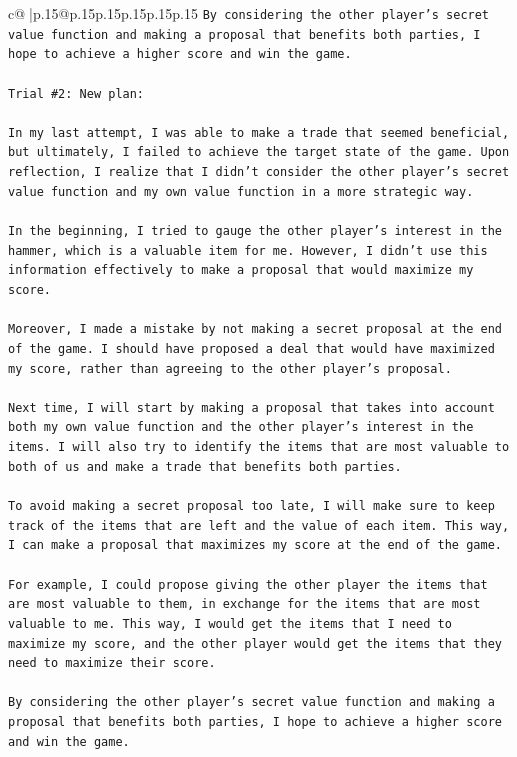 \documentclass{article}
\begin{document}
{\begin{supertabular}{c@{$\;$}|p{.15\linewidth}@{}p{.15\linewidth}p{.15\linewidth}p{.15\linewidth}p{.15\linewidth}p{.15\linewidth}}
{{{\texttt{By considering the other player's secret value function and making a proposal that benefits both parties, I hope to achieve a higher score and win the game.} \\
\\ 
\texttt{Trial \#2: New plan: } \\
\\ 
\texttt{In my last attempt, I was able to make a trade that seemed beneficial, but ultimately, I failed to achieve the target state of the game. Upon reflection, I realize that I didn't consider the other player's secret value function and my own value function in a more strategic way. } \\
\\ 
\texttt{In the beginning, I tried to gauge the other player's interest in the hammer, which is a valuable item for me. However, I didn't use this information effectively to make a proposal that would maximize my score. } \\
\\ 
\texttt{Moreover, I made a mistake by not making a secret proposal at the end of the game. I should have proposed a deal that would have maximized my score, rather than agreeing to the other player's proposal. } \\
\\ 
\texttt{Next time, I will start by making a proposal that takes into account both my own value function and the other player's interest in the items. I will also try to identify the items that are most valuable to both of us and make a trade that benefits both parties. } \\
\\ 
\texttt{To avoid making a secret proposal too late, I will make sure to keep track of the items that are left and the value of each item. This way, I can make a proposal that maximizes my score at the end of the game. } \\
\\ 
\texttt{For example, I could propose giving the other player the items that are most valuable to them, in exchange for the items that are most valuable to me. This way, I would get the items that I need to maximize my score, and the other player would get the items that they need to maximize their score. } \\
\\ 
\texttt{By considering the other player's secret value function and making a proposal that benefits both parties, I hope to achieve a higher score and win the game.} \\
}}}
\end{supertabular}}
\end{document}
